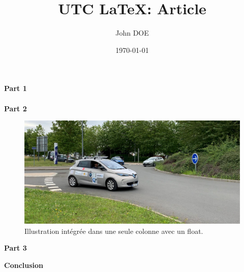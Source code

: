 \documentclass[a4paper,12pt]{article}
\title{UTC \LaTeX : Article}
\author{John DOE}
\date{\today}
\begin{document}
\articletitle

\begin{multicols}{2}

\textbf{Part 1} \\
\lipsum[1][1]
\lipsum[1][2]
\lipsum[1][3]
\lipsum[1][4]
\lipsum[1][5] \\

\textbf{Part 2} \\
\lipsum[2][1]

\begin{figure}[H]
\centering
\includegraphics[width=\linewidth]{img/zoe_hds.jpg}
\caption{Illustration intégrée dans une seule colonne avec un float.}
\end{figure}

\lipsum[2][2]
\lipsum[2][3]
\lipsum[2][4]

\textbf{Part 3} \\
\lipsum[3]

\textbf{Conclusion} \\
\lipsum[4]

\end{multicols}
\end{document}
